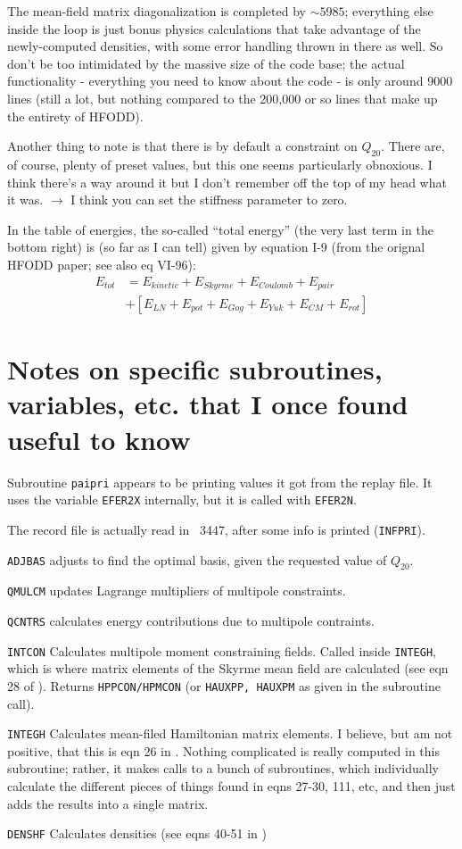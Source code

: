 The mean-field matrix diagonalization is completed by $\sim5985$; everything else inside the loop is just bonus physics calculations that take advantage of the newly-computed densities, with some error handling thrown in there as well. So don't be too intimidated by the massive size of the code base; the actual functionality - everything you need to know about the code - is only around 9000 lines (still a lot, but nothing compared to the 200,000 or so lines that make up the entirety of HFODD).

Another thing to note is that there is by default a constraint on $Q_{20}$. There are, of course, plenty of preset values, but this one seems particularly obnoxious. I think there's a way around it but I don't remember off the top of my head what it was. $\rightarrow$ I think you can set the stiffness parameter to zero.

In the table of energies, the so-called ``total energy'' (the very last term in the bottom right) is (so far as I can tell) given by equation I-9 (from the orignal HFODD paper; see also eq VI-96):
\begin{align}
E_{tot} &= E_{kinetic} + E_{Skyrme} + E_{Coulomb} + E_{pair} \\
& + \left[ E_{LN} + E_{pot} + E_{Gog} + E_{Yuk} + E_{CM} + E_{rot} \right]
\end{align}

\section*{Notes on specific subroutines, variables, etc. that I once found useful to know}

Subroutine \texttt{paipri} appears to be printing values it got from the replay file. It uses the variable \texttt{EFER2X} internally, but it is called with \texttt{EFER2N}.

The record file is actually read in ~3447, after some info is printed (\texttt{INFPRI}).

\texttt{ADJBAS} adjusts to find the optimal basis, given the requested value of $Q_{20}$.

\texttt{QMULCM} updates Lagrange multipliers of multipole constraints.

\texttt{QCNTRS} calculates energy contributions due to multipole contraints.

\texttt{INTCON} Calculates multipole moment constraining fields. Called inside \texttt{INTEGH}, which is where matrix elements of the Skyrme mean field are calculated (see eqn 28 of \cite{Dobaczewski1997}). Returns \texttt{HPPCON/HPMCON} (or \texttt{HAUXPP, HAUXPM} as given in the subroutine call).

\texttt{INTEGH} Calculates mean-filed Hamiltonian matrix elements. I believe, but am not positive, that this is eqn 26 in \cite{Dobaczewski1997}. Nothing complicated is really computed in this subroutine; rather, it makes calls to a bunch of subroutines, which individually calculate the different pieces of things found in eqns 27-30, 111, etc, and then just adds the results into a single matrix.

\texttt{DENSHF} Calculates densities (see eqns 40-51 in \cite{Dobaczewski1997})